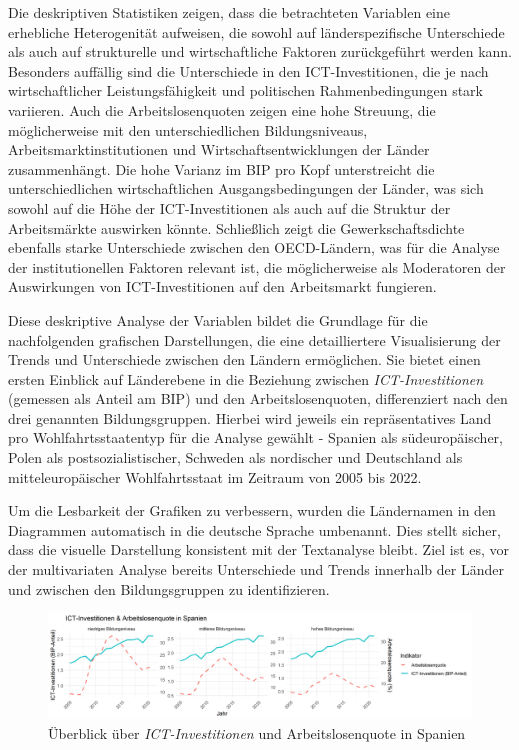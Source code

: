 Die deskriptiven Statistiken zeigen, dass die betrachteten Variablen eine erhebliche 
Heterogenität aufweisen, die sowohl auf länderspezifische Unterschiede als auch auf 
strukturelle und wirtschaftliche Faktoren zurückgeführt werden kann. Besonders auffällig 
sind die Unterschiede in den \ac{ICT}-Investitionen, die je nach wirtschaftlicher 
Leistungsfähigkeit und politischen Rahmenbedingungen stark variieren. Auch die 
Arbeitslosenquoten zeigen eine hohe Streuung, die möglicherweise mit den unterschiedlichen 
Bildungsniveaus, Arbeitsmarktinstitutionen und Wirtschaftsentwicklungen der Länder 
zusammenhängt. Die hohe Varianz im \ac{BIP} pro Kopf unterstreicht die unterschiedlichen 
wirtschaftlichen Ausgangsbedingungen der Länder, was sich sowohl auf die Höhe der 
\ac{ICT}-Investitionen als auch auf die Struktur der Arbeitsmärkte auswirken könnte. 
Schließlich zeigt die Gewerkschaftsdichte ebenfalls starke Unterschiede zwischen den 
OECD-Ländern, was für die Analyse der institutionellen Faktoren relevant ist, die 
möglicherweise als Moderatoren der Auswirkungen von \ac{ICT}-Investitionen auf den 
Arbeitsmarkt fungieren.

Diese deskriptive Analyse der Variablen bildet die Grundlage für die nachfolgenden 
grafischen Darstellungen, die eine detailliertere Visualisierung der Trends und Unterschiede 
zwischen den Ländern ermöglichen. Sie bietet einen ersten Einblick auf Länderebene in die 
Beziehung zwischen \textit{\ac{ICT}-Investitionen} (gemessen als Anteil am \ac{BIP}) und 
den Arbeitslosenquoten, differenziert nach den drei genannten Bildungsgruppen. Hierbei 
wird jeweils ein repräsentatives Land pro Wohlfahrtsstaatentyp für die Analyse gewählt - 
Spanien als südeuropäischer, Polen als postsozialistischer, Schweden als nordischer und 
Deutschland als mitteleuropäischer Wohlfahrtsstaat im Zeitraum von 2005 bis 2022. 

Um die Lesbarkeit der Grafiken zu verbessern, wurden die Ländernamen in den Diagrammen automatisch 
in die deutsche Sprache umbenannt. Dies stellt sicher, dass die visuelle Darstellung konsistent 
mit der Textanalyse bleibt. Ziel ist es, vor der multivariaten Analyse bereits Unterschiede und 
Trends innerhalb der Länder und zwischen den Bildungsgruppen zu identifizieren.


\begin{figure}[htbp]
    \centering
    \includegraphics[width=\textwidth]{assets/plot_spain.png}
    \caption{Überblick über \textit{\ac{ICT}-Investitionen} und Arbeitslosenquote in 
    Spanien}
    \label{fig:spain}
\end{figure}


